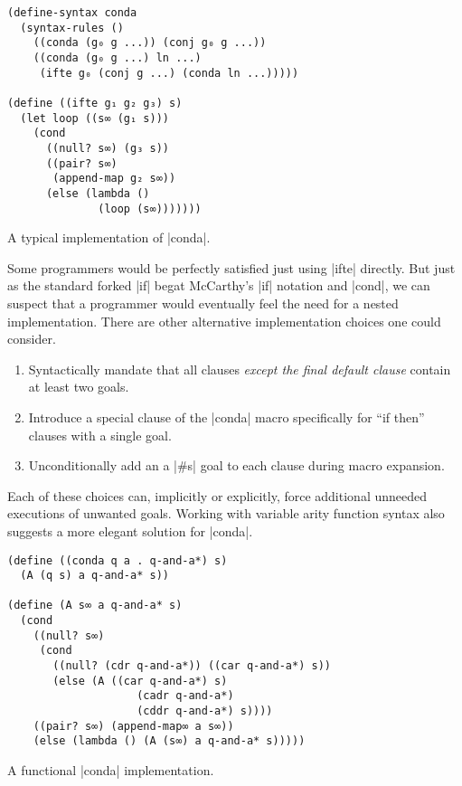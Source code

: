 \documentclass[sigplan,screen,draft,anonymous,review,natbib=false]{acmart}
\begin{document}
\begin{listing}
  \begin{verbatim}
(define-syntax conda
  (syntax-rules ()
    ((conda (g₀ g ...)) (conj g₀ g ...))
    ((conda (g₀ g ...) ln ...)
     (ifte g₀ (conj g ...) (conda ln ...)))))

(define ((ifte g₁ g₂ g₃) s)
  (let loop ((s∞ (g₁ s)))
    (cond
      ((null? s∞) (g₃ s))
      ((pair? s∞)
       (append-map g₂ s∞))
      (else (lambda ()
              (loop (s∞)))))))
  \end{verbatim}
  \caption{A typical implementation of \rackinline|conda|.}
  \label{mnt:conda-implementation}
\end{listing}

Some programmers would be perfectly satisfied just using
\rackinline|ifte| directly. But just as the standard forked
\rackinline|if| begat McCarthy's \rackinline|if| notation and
\rackinline|cond|, we can suspect that a programmer would eventually
feel the need for a nested implementation. There are other alternative
implementation choices one could consider.

\begin{enumerate}

\item Syntactically mandate that all clauses \emph{except the final
    default clause} contain at least two goals.

\item Introduce a special clause of the \rackinline|conda| macro
  specifically for \enquote{if then} clauses with a single goal.

\item Unconditionally add an a \rackinline|#s| goal to each clause
  during macro expansion.

\end{enumerate}

Each of these choices can, implicitly or explicitly, force additional
unneeded executions of unwanted goals. Working with variable arity
function syntax also suggests a more elegant solution for
\rackinline|conda|.

\begin{listing}
  \begin{verbatim}
(define ((conda q a . q-and-a*) s)
  (A (q s) a q-and-a* s))

(define (A s∞ a q-and-a* s)
  (cond
    ((null? s∞)
     (cond
       ((null? (cdr q-and-a*)) ((car q-and-a*) s))
       (else (A ((car q-and-a*) s)
                    (cadr q-and-a*)
                    (cddr q-and-a*) s))))
    ((pair? s∞) (append-map∞ a s∞))
    (else (lambda () (A (s∞) a q-and-a* s)))))
  \end{verbatim}
  \caption{A functional \rackinline|conda| implementation.}
  \label{mnt:conda-good-re-implementation}
\end{listing}
\end{document}
